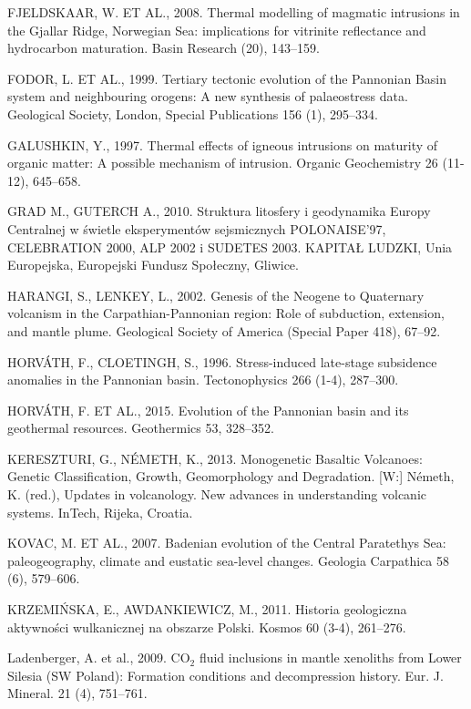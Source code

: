 \documentclass[11.5pt,twoside]{report}
\begin{document}
\begin{multicols}{3}
\uppercase{Fjeldskaar, W. et al., 2008.} Thermal modelling of magmatic intrusions in the Gjallar Ridge, Norwegian Sea: implications for vitrinite reflectance and hydrocarbon maturation. Basin Research (20), 143–159. 

\uppercase{Fodor, L. et al., 1999.} Tertiary tectonic evolution of the Pannonian Basin system and neighbouring orogens: A new synthesis of palaeostress data. Geological Society, London, Special Publications 156 (1), 295–334. 

\uppercase{Galushkin, Y., 1997.} Thermal effects of igneous intrusions on maturity of organic matter: A possible mechanism of intrusion. Organic Geochemistry 26 (11-12), 645–658. 

\uppercase{Grad M., Guterch A., 2010.} Struktura litosfery i geodynamika Europy Centralnej w świetle eksperymentów sejsmicznych POLONAISE’97, CELEBRATION 2000, ALP 2002 i SUDETES 2003. KAPITAŁ LUDZKI, Unia Europejska, Europejski Fundusz Społeczny, Gliwice.

\uppercase{Harangi, S., Lenkey, L., 2002.} Genesis of the Neogene to Quaternary volcanism in the Carpathian-Pannonian region: Role of subduction, extension, and mantle plume. Geological Society of America (Special Paper 418), 67–92.

\uppercase{Horv\'{A}th, F., Cloetingh, S., 1996.} Stress-induced late-stage subsidence anomalies in the Pannonian basin. Tectonophysics 266 (1-4), 287–300.

\uppercase{Horv\'{A}th, F. et al., 2015.} Evolution of the Pannonian basin and its geothermal resources. Geothermics 53, 328–352. 

\uppercase{Kereszturi, G., N\'{E}meth, K., 2013.} Monogenetic Basaltic Volcanoes: Genetic Classification, Growth, Geomorphology and Degradation. [W:] Németh, K. (red.), Updates in volcanology. New advances in understanding volcanic systems. InTech, Rijeka, Croatia.

\uppercase{Kovac, M. et al., 2007.} Badenian evolution of the Central Paratethys Sea: paleogeography, climate and eustatic sea-level changes. Geologia Carpathica 58 (6), 579–606.

\uppercase{Krzemi\'{N}ska, E., Awdankiewicz, M., 2011.} Historia geologiczna aktywności wulkanicznej na obszarze Polski. Kosmos 60 (3-4), 261–276.

Ladenberger, A. et al., 2009. CO$_2$ fluid inclusions in mantle xenoliths from Lower Silesia (SW Poland): Formation conditions and decompression history. Eur. J. Mineral. 21 (4), 751–761.


\end{multicols}
\end{document}
